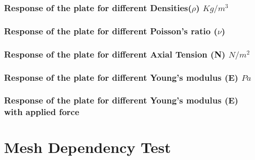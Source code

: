 \documentclass[9pt]{beamer}
\begin{document}
\begin{frame}
\frametitle{Response of the plate for different Densities($\rho$) $Kg/m^3$}
\begin{figure}[h!]
\centering

\end{figure}
\end{frame}

\begin{frame}
\frametitle{Response of the plate for different Poisson's ratio ($\nu$)}
\begin{figure}[h!]
\centering

\end{figure}
\end{frame}

\begin{frame}
\frametitle{Response of the plate for different Axial Tension (N) $N/m^2$}
\begin{figure}[h!]
\centering

\end{figure}
\end{frame}

\begin{frame}
\frametitle{Response of the plate for different Young's modulus (E) $Pa$}
\begin{figure}[h!]
\centering

\end{figure}
\end{frame}



\begin{frame}
\frametitle{Response of the plate for different Young's modulus (E) with applied force}
\begin{figure}[h!]
\centering

\end{figure}
\end{frame}


\section{Mesh Dependency Test}
\end{document}

